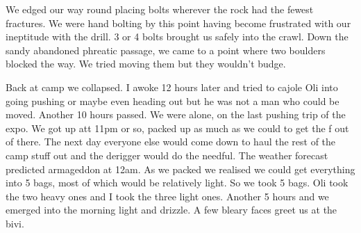 We edged our way round placing bolts wherever the rock had the fewest fractures. We were hand bolting by this point having become frustrated with our ineptitude with the drill. 3 or 4 bolts brought us safely into the crawl. Down the sandy abandoned phreatic passage, we came to a point where two boulders blocked the way. We tried moving them but they wouldn’t budge. 

 
Back at camp we collapsed. I awoke 12 hours later and tried to cajole Oli into going pushing or maybe even heading out but he was not a man who could be moved. Another 10 hours passed.  We were alone, on the last pushing trip of the expo. We got up att 11pm or so, packed up as much as we could to get the f out of there. The next day everyone else would come down to haul the rest of the camp stuff out and the derigger would do the needful. The weather forecast predicted armageddon at 12am. As we packed we realised we could get everything into 5 bags, most of which would be relatively light. So we took 5 bags. Oli took the two heavy ones and I took the three light ones. Another 5 hours and we emerged into the morning light and drizzle. A few bleary faces greet us at the bivi.

